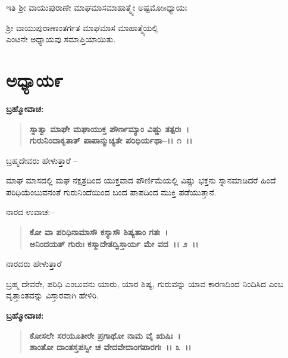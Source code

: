 \begin{center}
ಇತಿ ಶ‍್ರೀ ವಾಯುಪುರಾಣೇ ಮಾಘಮಾಸಮಾಹಾತ್ಮ್ಯೇ ಅಷ್ಟಮೋsಧ್ಯಾಯಃ
\end{center}

\begin{center}
 ಶ‍್ರೀ ವಾಯುಪುರಾಣಾಂತರ್ಗತ ಮಾಘಮಾಸ ಮಾಹಾತ್ಮ್ಯೆಯಲ್ಲಿ \\ ಎಂಟನೇ ಅಧ್ಯಾಯವು ಸಮಾಪ್ತಿಯಾಯಿತು.
\end{center}

\newpage

\section*{ಅಧ್ಯಾಯ೯}

\emptypage

\begin{flushleft}
\textbf{ಬ್ರಹ್ಮೋವಾಚ: }
\end{flushleft}

\begin{verse}
\textbf{ಸ್ನಾತ್ವಾ ಮಾಘೇ ಮಘಾಯುಕ್ತ ಪೌರ್ಣಮ್ಯಾಂ ವಿಷ್ಣು ತತ್ಪರಃ~।}\\\textbf{ಗುರುನಿಂದಾಕೃತಾತ್ ಪಾಪಾನ್ಮುಚ್ಯತೇ ಪರಿಧಿರ್ಯಥಾ–।। ೧~।।}
\end{verse}

\begin{flushleft}
ಬ್ರಹ್ಮದೇವರು ಹೇಳುತ್ತಾರೆ –
\end{flushleft}

ಮಾಘ ಮಾಸದಲ್ಲಿ ಮಘ ನಕ್ಷತ್ರದಿಂದ ಯುಕ್ತವಾದ ಪೌರ್ಣಿಮೆಯಲ್ಲಿ ವಿಷ್ಣು ಭಕ್ತನು ಸ್ನಾನಮಾಡಿದರೆ ಹಿಂದೆ ಪರಿಧಿಯೆಂಬುವನಂತೆ ಗುರುನಿಂದೆಯಿಂದ ಬಂದ ಪಾಪದಿಂದ ಮುಕ್ತಿ ಪಡೆಯುತ್ತಾನೆ. 

\noindent
ನಾರದ ಉವಾಚ:–

\begin{verse}
\textbf{ಕೋ ವಾ ಪರಿಧಿನಾಮಾಸೌ ಕಸ್ಯಾಸೌ ಶಿಷ್ಯತಾಂ ಗತಃ~।}\\\textbf{ಅನಿಂದಯತ್ ಗುರುಃ ಕಸ್ಮಾದೇತದ್ವಿಸ್ತಾರ್ಯ ಮೇ ವದ~।। ೨~।। }
\end{verse}

\begin{flushleft}
ನಾರದರು ಹೇಳುತ್ತಾರೆ
\end{flushleft}

ಬ್ರಹ್ಮ ದೇವರೇ, ಪರಿಧಿ ಎಂಬುವನು ಯಾರು, ಯಾರ ಶಿಷ್ಯ, ಗುರುವನ್ನು ಯಾವ ಕಾರಣದಿಂದ ನಿಂದಿಸಿದ ಎಂಬ ವೃತ್ತಾಂತವನ್ನು ವಿಸ್ತಾರವಾಗಿ ಹೇಳಿರಿ.

\begin{flushleft}
\textbf{ಬ್ರಹ್ಮೋವಾಚ: }
\end{flushleft}

\begin{verse}
\textbf{ಕೋಸಲೇ ಸರಯೂತೀರೇ ಪ್ರಗಾಥೋ ನಾಮ ವೈ ಋಷಿಃ~।}\\\textbf{ಶಾಂತೋ ದಾಂತಸ್ತಪಸ್ವೀ ಚ ವೇದವೇದಾಂಗಪಾರಗಃ~।। ೩~।।}
\end{verse}

